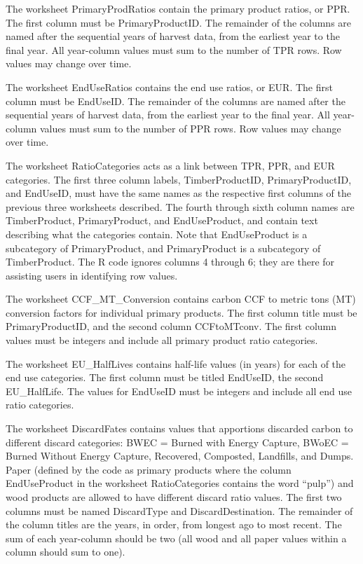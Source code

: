 \documentclass[
]{book}
\begin{document}
The worksheet PrimaryProdRatios contain the primary product ratios, or PPR. The first column must be PrimaryProductID. The remainder of the columns are named after the sequential years of harvest data, from the earliest year to the final year. All year-column values must sum to the number of TPR rows. Row values may change over time.

The worksheet EndUseRatios contains the end use ratios, or EUR. The first column must be EndUseID. The remainder of the columns are named after the sequential years of harvest data, from the earliest year to the final year. All year-column values must sum to the number of PPR rows. Row values may change over time.

The worksheet RatioCategories acts as a link between TPR, PPR, and EUR categories. The first three column labels, TimberProductID, PrimaryProductID, and EndUseID, must have the same names as the respective first columns of the previous three worksheets described. The fourth through sixth column names are TimberProduct, PrimaryProduct, and EndUseProduct, and contain text describing what the categories contain. Note that EndUseProduct is a subcategory of PrimaryProduct, and PrimaryProduct is a subcategory of TimberProduct. The R code ignores columns 4 through 6; they are there for assisting users in identifying row values.

The worksheet CCF\_MT\_Conversion contains carbon CCF to metric tons (MT) conversion factors for individual primary products. The first column title must be PrimaryProductID, and the second column CCFtoMTconv. The first column values must be integers and include all primary product ratio categories.

The worksheet EU\_HalfLives contains half-life values (in years) for each of the end use categories. The first column must be titled EndUseID, the second EU\_HalfLife. The values for EndUseID must be integers and include all end use ratio categories.

The worksheet DiscardFates contains values that apportions discarded carbon to different discard categories: BWEC = Burned with Energy Capture, BWoEC = Burned Without Energy Capture, Recovered, Composted, Landfills, and Dumps. Paper (defined by the code as primary products where the column EndUseProduct in the worksheet RatioCategories contains the word ``pulp'') and wood products are allowed to have different discard ratio values. The first two columns must be named DiscardType and DiscardDestination. The remainder of the column titles are the years, in order, from longest ago to most recent. The sum of each year-column should be two (all wood and all paper values within a column should sum to one).
\end{document}
